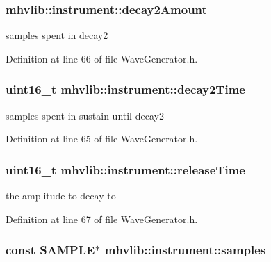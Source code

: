 \hypertarget{structmhvlib_1_1instrument_a51c971bdc3fe7b675f0fb1cfe42e48c5}{
\subsubsection[{decay2\-Amount}]{ mhvlib\-::instrument\-::decay2\-Amount}}\label{structmhvlib_1_1instrument_a51c971bdc3fe7b675f0fb1cfe42e48c5}
samples spent in decay2 

Definition at line 66 of file Wave\-Generator.\-h.

\hypertarget{structmhvlib_1_1instrument_a61f12f07350d2930caf3dac23521dc76}{
\subsubsection[{decay2\-Time}]{\setlength{\rightskip}{0pt plus 5cm}uint16\-\_\-t mhvlib\-::instrument\-::decay2\-Time}}\label{structmhvlib_1_1instrument_a61f12f07350d2930caf3dac23521dc76}
samples spent in sustain until decay2 

Definition at line 65 of file Wave\-Generator.\-h.

\hypertarget{structmhvlib_1_1instrument_a8434571b2e69adf17e76ee3d1b4d9dd3}{
\subsubsection[{release\-Time}]{\setlength{\rightskip}{0pt plus 5cm}uint16\-\_\-t mhvlib\-::instrument\-::release\-Time}}\label{structmhvlib_1_1instrument_a8434571b2e69adf17e76ee3d1b4d9dd3}
the amplitude to decay to 

Definition at line 67 of file Wave\-Generator.\-h.

\hypertarget{structmhvlib_1_1instrument_a055994ae16bd874787ad27b2132c7ea7}{
\subsubsection[{samples}]{\setlength{\rightskip}{0pt plus 5cm}const {\bf S\-A\-M\-P\-L\-E}$\ast$ mhvlib\-::instrument\-::samples}}\label{structmhvlib_1_1instrument_a055994ae16bd874787ad27b2132c7ea7}


